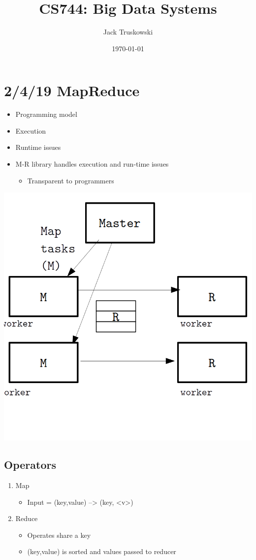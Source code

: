 \documentclass[11pt]{article}
\author{Jack Truskowski}
\date{\today}
\title{CS744: Big Data Systems}
\begin{document}
\maketitle
\tableofcontents


\section{2/4/19 MapReduce}
\label{sec:orgheadline4}
\begin{itemize}
\item Programming model
\item Execution
\item Runtime issues
\item M-R library handles execution and run-time issues
\begin{itemize}
\item Transparent to programmers
\end{itemize}
\end{itemize}

\includegraphics[width=.9\linewidth]{diagrams/masterworker.png}

\subsection{Operators}
\label{sec:orgheadline1}
\begin{enumerate}
\item Map
\begin{itemize}
\item Input = (key,value) --> (key, <v>)
\end{itemize}
\item Reduce
\begin{itemize}
\item Operates share a key
\item (key,value) is sorted and values passed to reducer
\end{itemize}
\end{enumerate}
\end{document}

